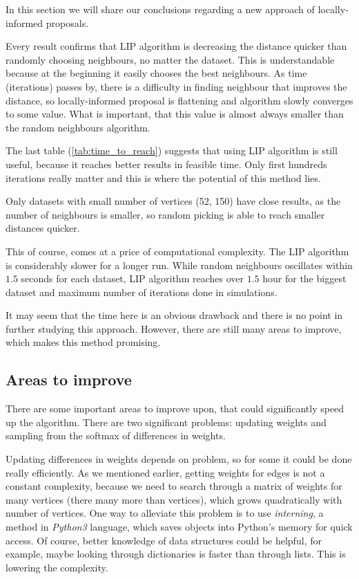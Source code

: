 In this section we will share our conclusions regarding a new approach of locally-informed proposals.

Every result confirms that LIP algorithm is decreasing the distance quicker than randomly choosing neighbours, no matter the dataset. This is understandable because at the beginning it easily chooses the best neighbours. As time (iterations) passes by, there is a difficulty in finding neighbour that improves the distance, so locally-informed proposal is flattening and algorithm slowly converges to some value. What is important, that this value is almost always smaller than the random neighbours algorithm.

The last table (\ref{tab:time_to_reach}) suggests that using LIP algorithm is still useful, because it reaches better results in feasible time. Only first hundreds iterations really matter and this is where the potential of this method lies.

Only datasets with small number of vertices (52, 150) have close results, as the number of neighbours is smaller, so random picking is able to reach smaller distances quicker.

This of course, comes at a price of computational complexity. The LIP algorithm is considerably slower for a longer run. While random neighbours oscillates within $1.5$ seconds for each dataset, LIP algorithm reaches over $1.5$ hour for the biggest dataset and maximum number of iterations done in simulations.

It may seem that the time here is an obvious drawback and there is no point in further studying this approach. However, there are still many areas to improve, which makes this method promising.

\subsection{Areas to improve}
	There are some important areas to improve upon, that could significantly speed up the algorithm. There are two significant problems: updating weights and sampling from the softmax of differences in weights. 
	
	Updating differences in weights depends on problem, so for some it could be done really efficiently. As we mentioned earlier, getting weights for edges is not a constant complexity, because we need to search through a matrix of weights for many vertices (there many more than vertices), which grows quadratically with number of vertices. One way to alleviate this problem is to use \textit{interning}, a method in \textit{Python3} language, which saves objects into Python's memory for quick access. Of course, better knowledge of data structures could be helpful, for example, maybe looking through dictionaries is faster than through lists. This is lowering the complexity.
	
